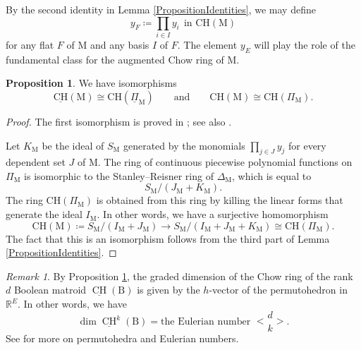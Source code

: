 \documentclass[11pt,reqno]{amsart}
\theoremstyle{definition}
\newtheorem{proposition}[theorem]{Proposition}
\theoremstyle{remark}
\newtheorem{remark}[theorem]{Remark}
\renewcommand{\dim}{\operatorname{dim}}
\renewcommand{\(}{\left(}
\renewcommand{\)}{\right)}
\newcommand{\<}{\left<}
\renewcommand{\>}{\right>}
\renewcommand{\and}{\qquad\text{and}\qquad}
\newcommand{\CH}{\operatorname{CH}}
\DeclareRobustCommand{\eulerian}{\genfrac<>{0pt}{}}
\begin{document}
By the second identity in Lemma \ref{PropositionIdentities}, we may define
 \[
 y_F \coloneq  \prod_{i \in I} y_i \ \ \text{in $\mathrm{CH}(\mathrm{M})$}
 \]
for any flat $F$ of $\mathrm{M}$ and any basis $I$ of $F$.
The element $y_E$ will play the role of the fundamental class for the augmented Chow ring of $\mathrm{M}$.





\begin{proposition}\label{PropositionToricInterpretation}
We have isomorphisms $$\underline{\mathrm{CH}}(\mathrm{M})\cong \mathrm{CH}(\underline{\Pi}_\mathrm{M})
\and
\mathrm{CH}(\mathrm{M})\cong \mathrm{CH}(\Pi_\mathrm{M}).$$
\end{proposition}


\begin{proof}
The first isomorphism is proved in \cite[Theorem 3]{FY}; see also \cite[Section 5.3]{AHK}.

Let $K_\mathrm{M}$ be the ideal of $S_\mathrm{M}$ generated by the monomials 
$\prod_{j \in J} y_j$ for every dependent set $J$ of $\mathrm{M}$.
The ring of continuous piecewise polynomial functions on $\Pi_\mathrm{M}$ is isomorphic to the Stanley--Reisner
ring of $\Delta_{\mathrm{M}}$, which is equal to $$S_\mathrm{M} / (J_\mathrm{M} + K_\mathrm{M}).$$
The ring $\mathrm{CH}(\Pi_\mathrm{M})$ is obtained from this ring by killing the linear forms that generate the ideal $I_\mathrm{M}$.
In other words, we have a surjective homomorphism
$$\mathrm{CH}(\mathrm{M}) \coloneq S_\mathrm{M} / (I_\mathrm{M} + J_\mathrm{M})
\longrightarrow
S_\mathrm{M} / (I_\mathrm{M} + J_\mathrm{M}  + K_\mathrm{M})
\cong \mathrm{CH}(\Pi_\mathrm{M}).$$
The fact that this is an isomorphism follows from the third part of Lemma \ref{PropositionIdentities}.
\end{proof}


\begin{remark}
By Proposition \ref{PropositionToricInterpretation},
the graded dimension of the Chow ring of the rank $d$ Boolean matroid  $\underline{\CH}(\mathrm{B})$
is given by the $h$-vector of the permutohedron in $\mathbb{R}^E$.
In other words, we have
\[
\dim \underline{\CH}^k(\mathrm{B})=\text{the Eulerian number $\eulerian{d}{k}$}.
\]
See \cite[Section 9.1]{Petersen} for more on permutohedra and Eulerian numbers.
\end{remark}
\end{document}
